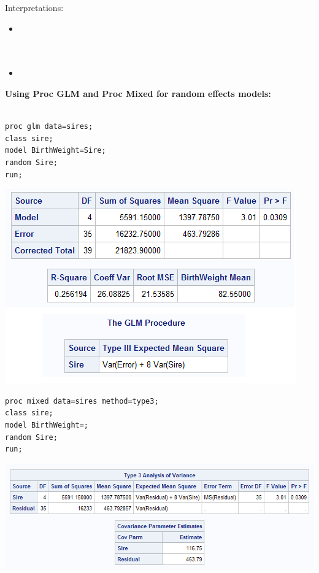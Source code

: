 Interpretations:
\begin{itemize}
\item ~\\~\\~\\
\item ~\\
\end{itemize}

\newpage

\textbf{Using Proc GLM and Proc Mixed for random effects models:}\\~\\
\begin{small}
\begin{verbatim}
proc glm data=sires;                 
class sire;                          
model BirthWeight=Sire;              
random Sire;                         
run;                                 
\end{verbatim}
\end{small}

\begin{center}
\includegraphics[scale=0.8]{Sire1}
\end{center}

\begin{small}
\begin{verbatim}
proc mixed data=sires method=type3;                 
class sire;                          
model BirthWeight=;              
random Sire;                         
run;                                 
\end{verbatim}
\end{small}

\begin{center}
\includegraphics[scale=0.8]{Sire2}
\end{center}

